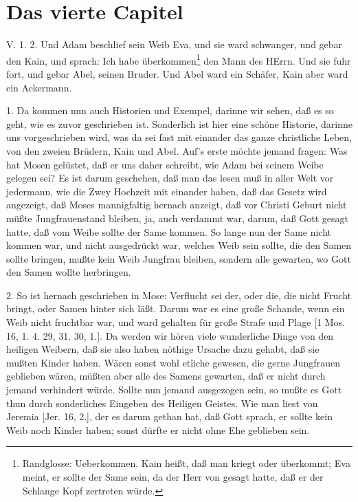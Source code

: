 \section{Das vierte Capitel}

V. 1. 2. Und Adam beschlief sein Weib Eva, und sie ward schwanger, und gebar den Kain, und sprach: Ich habe überkommen\footnote{Randglosse: Ueberkommen. Kain heißt, daß man kriegt oder überkommt; Eva meint, er sollte der Same sein, da der Herr von gesagt hatte, daß er der Schlange Kopf zertreten würde.} den Mann des HErrn. Und sie fuhr fort, und gebar Abel, seinen Bruder. Und Abel ward ein Schäfer, Kain aber ward ein Ackermann.

1. Da kommen nun auch Historien und Exempel, darinne wir sehen, daß es so geht, wie es zuvor geschrieben ist. Sonderlich ist hier eine schöne Historie, darinne uns vorgeschrieben wird, was da sei fast mit einander das ganze christliche Leben, von den zweien Brüdern, Kain und Abel. Auf’s erste möchte jemand fragen: Was hat Mosen gelüstet, daß er uns daher schreibt, wie Adam bei seinem Weibe gelegen sei? Es ist darum geschehen, daß man das lesen muß in
aller Welt vor jedermann, wie die Zwey Hochzeit mit einander haben, daß das Gesetz wird angezeigt, daß Moses mannigfaltig hernach anzeigt, daß vor Christi Geburt nicht müßte Jungfrauenstand bleiben, ja, auch verdammt war, darum, daß Gott gesagt hatte, daß vom Weibe sollte der Same kommen. So lange nun der Same nicht kommen war, und nicht ausgedrückt war, welches Weib sein sollte, die den Samen sollte bringen, mußte kein Weib Jungfrau bleiben, sondern alle gewarten, wo Gott den Samen wollte herbringen.

2. So ist hernach geschrieben in Mose: Verflucht sei der, oder die, die nicht Frucht bringt, oder Samen hinter sich läßt. Darum war es eine große Schande, wenn ein Weib nicht fruchtbar war, und ward gehalten für große Strafe und Plage [1 Mos. 16, 1. 4. 29, 31. 30, 1.]. Da werden wir hören viele wunderliche Dinge von den heiligen Weibern, daß sie also haben nöthige Ursache dazu gehabt, daß sie mußten Kinder haben. Wären sonst wohl etliche gewesen, die gerne Jungfrauen geblieben wären, müßten aber alle des Samens gewarten, daß er nicht durch jemand verhindert würde. Sollte nun jemand ausgezogen sein, so mußte es Gott thun durch sonderliches Eingeben des Heiligen Geistes. Wie man liest von Jeremia [Jer. 16, 2.], der es darum gethan hat, daß Gott sprach, er sollte kein Weib noch Kinder haben; sonst dürfte er nicht ohne Ehe geblieben sein.

